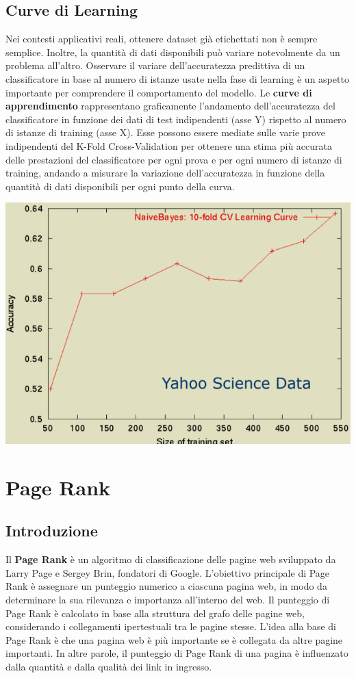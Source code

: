 \documentclass{report}
\begin{document}
	\section{Curve di Learning}
	Nei contesti applicativi reali, ottenere dataset già etichettati non è sempre semplice. Inoltre, la quantità di dati disponibili può variare notevolmente da un problema all'altro. Osservare il variare dell'accuratezza predittiva di un classificatore in base al numero di istanze usate nella fase di learning è un aspetto importante per comprendere il comportamento del modello. Le \textbf{curve di apprendimento} rappresentano graficamente l'andamento dell'accuratezza del classificatore in funzione dei dati di test indipendenti (asse Y) rispetto al numero di istanze di training (asse X). Esse possono essere mediate sulle varie prove indipendenti del K-Fold Cross-Validation per ottenere una stima più accurata delle prestazioni del classificatore per ogni prova e per ogni numero di istanze di training, andando a misurare la variazione dell'accuratezza in funzione della quantità di dati disponibili per ogni punto della curva.
	\begin{center}
		\includegraphics[scale=0.5]{assets/learning-curve.png}
	\end{center}

	\chapter{Page Rank}
	\section{Introduzione}
	Il \textbf{Page Rank} è un algoritmo di classificazione delle pagine web sviluppato da Larry Page e Sergey Brin, fondatori di Google. L'obiettivo principale di Page Rank è assegnare un punteggio numerico a ciascuna pagina web, in modo da determinare la sua rilevanza e importanza all'interno del web. Il punteggio di Page Rank è calcolato in base alla struttura del grafo delle pagine web, considerando i collegamenti ipertestuali tra le pagine stesse. L'idea alla base di Page Rank è che una pagina web è più importante se è collegata da altre pagine importanti. In altre parole, il punteggio di Page Rank di una pagina è influenzato dalla quantità e dalla qualità dei link in ingresso.
\end{document}
